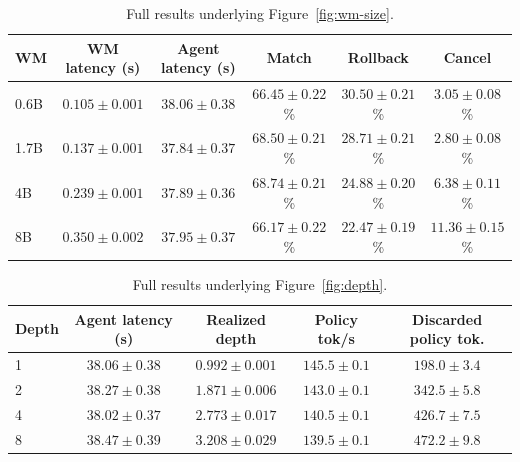 \documentclass{article} %
\begin{document}
\begin{table}[!ht]
    \centering
    \small
    \setlength{\tabcolsep}{4pt}
    \begin{tabular}{lccccc}
        \toprule
        WM & WM latency (s) & Agent latency (s) & Match & Rollback & Cancel \\
        \midrule
        0.6B & $0.105 \pm 0.001$ & $38.06 \pm 0.38$ & $66.45 \pm 0.22$\% & $30.50 \pm 0.21$\% & $3.05 \pm 0.08$\% \\
        1.7B & $0.137 \pm 0.001$ & $37.84 \pm 0.37$ & $68.50 \pm 0.21$\% & $28.71 \pm 0.21$\% & $2.80 \pm 0.08$\% \\
        4B   & $0.239 \pm 0.001$ & $37.89 \pm 0.36$ & $68.74 \pm 0.21$\% & $24.88 \pm 0.20$\% & $6.38 \pm 0.11$\% \\
        8B   & $0.350 \pm 0.002$ & $37.95 \pm 0.37$ & $66.17 \pm 0.22$\% & $22.47 \pm 0.19$\% & $11.36 \pm 0.15$\% \\
        \bottomrule
    \end{tabular}
    \caption{Full results underlying Figure~\ref{fig:wm-size}.}
    \label{tab:wm-size}
\end{table}

\begin{table}[!ht]
    \centering
    \small
    \setlength{\tabcolsep}{3pt}
    \begin{tabular}{lcccc}
        \toprule
        Depth & Agent latency (s) & Realized depth & Policy tok/s & Discarded policy tok. \\
        \midrule
        1 & $38.06 \pm 0.38$ & $0.992 \pm 0.001$ & $145.5 \pm 0.1$ & $198.0 \pm 3.4$ \\
        2 & $38.27 \pm 0.38$ & $1.871 \pm 0.006$ & $143.0 \pm 0.1$ & $342.5 \pm 5.8$ \\
        4 & $38.02 \pm 0.37$ & $2.773 \pm 0.017$ & $140.5 \pm 0.1$ & $426.7 \pm 7.5$ \\
        8 & $38.47 \pm 0.39$ & $3.208 \pm 0.029$ & $139.5 \pm 0.1$ & $472.2 \pm 9.8$ \\
        \bottomrule
    \end{tabular}
    \caption{Full results underlying Figure~\ref{fig:depth}.}
    \label{tab:depth}
\end{table}
\end{document}
